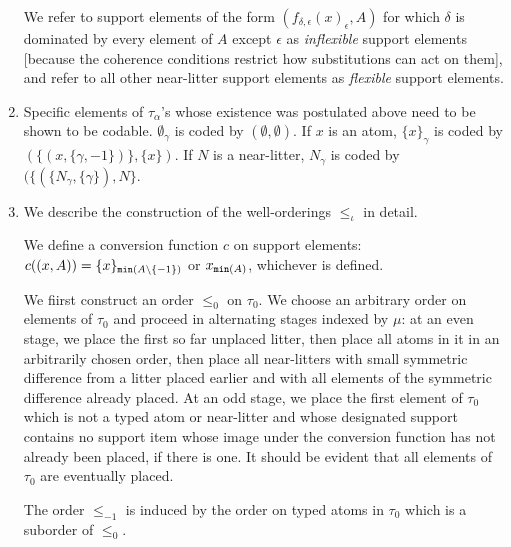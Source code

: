 \documentclass[12pt]{article}
\begin{document}
\begin{enumerate}
We refer to support elements of the form $(f_{\delta,\epsilon}(x)_\epsilon,A)$ for which $\delta$ is dominated by every element of $A$ except $\epsilon$ as {\em inflexible\/} support elements [because the coherence conditions restrict how substitutions can act on them], and refer to all other near-litter support elements as {\em flexible\/} support elements.

\item Specific elements of $\tau_\alpha$'s whose existence was postulated above need to be shown to be codable.  $\emptyset_\gamma$ is coded by $(\emptyset,\emptyset)$.  If $x$ is an atom, $\{x\}_\gamma$ is coded by $(\{(x,\{\gamma,-1\})\},\{x\})$.  If $N$ is a near-litter,
$N_\gamma$ is coded by $(\{(\{N_\gamma,\{\gamma\}),N\}$.

\item  We describe the construction of the well-orderings $\leq_\iota$ in detail.

We define a conversion function $c$ on support elements:  $c((x,A)) = \{x\}_{{\tt min}(A\setminus \{-1\})}$ or $x_{{\tt min}(A)}$, whichever is defined.

We fiirst construct an order $\leq_0$  on $\tau_0$.  We choose an arbitrary order on elements of $\tau_0$ and proceed in alternating stages indexed by $\mu$:  at an even stage, we place the first so far unplaced litter, then place all atoms in it in an arbitrarily chosen order, then place all near-litters with small symmetric difference from a litter placed earlier and with all elements of the symmetric difference already placed.  At an odd stage, we place the first element of $\tau_0$ which is not a typed atom or near-litter and whose designated support contains no support item whose image under the conversion function has not already been placed, if there is one.  It should be evident that all elements of $\tau_0$ are eventually placed.

The order $\leq_{-1}$
is induced by the order on typed atoms in $\tau_0$ which is a suborder of $\leq_0$.




\end{enumerate}
\end{document}
